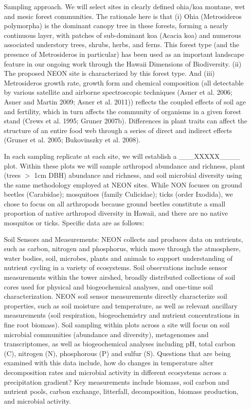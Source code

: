 \documentclass[11pt]{article}
\makeatletter
\renewcommand{\paragraph}{\@startsection{paragraph}{4}{\z@}
  {1ex \@plus 1ex \@minus .2ex}{-1em}
  {\normalfont\normalsize\it}
}
\makeatother
\begin{document}
\paragraph{Sampling approach.}
We will select sites in clearly defined ohia/koa montane, wet and mesic forest communities. The rationale here is that (i) Ohia (Metrosideros polymorpha) is the dominant canopy tree in these forests, forming a nearly continuous layer, with patches of sub-dominant koa (Acacia koa) and numerous associated understory trees, shrubs, herbs, and ferns. This forest type (and the presence of Metrosideros in particular) has been used as an important landscape feature in our ongoing work through the Hawaii Dimensions of Biodiversity. (ii) The proposed NEON site is characterized by this forest type. And (iii) Metrosideros growth rate, growth form and chemical composition (all detectable by various satellite and airborne spectroscopic techniques (Asner et al. 2006; Asner and Martin 2009; Asner et al. 2011)) reflects the coupled effects of soil age and fertility, which in turn affects the community of organisms in a given forest stand (Crews et al. 1995; Gruner 2007b). Differences in plant traits can affect the structure of an entire food web through a series of direct and indirect effects (Gruner et al. 2005; Bukovinszky et al. 2008).

In each sampling replicate at each site, we will establish a ___XXXXX____ plot. Within these plots we will sample arthropod abundance and richness, plant (trees $>$ 1cm DBH) abundance and richness, and soil microbial diversity using the same methodology employed at NEON sites.  While NON focuses on ground beetles (Carabidae); mosquitoes (family Culicidae); ticks (order Ixodida), we chose to focus on all arthropods because ground beetles constitute a small proportion of native arthropod diversity in Hawaii, and there are no native mosquitos or ticks.  Specific data are as follows:

Soil Sensors and Measurements: NEON collects and produces data on nutrients, such as carbon, nitrogen and phosphorus, which move through the atmosphere, water bodies, soil, microbes, plants and animals to support understanding of nutrient cycling in a variety of ecosystems. Soil observations include sensor measurements within the tower airshed, broadly distributed collections of soil cores used for physical and biogeochemical analyses, and one-time soil characterization. NEON soil sensor measurements directly characterize soil properties, such as soil moisture and temperature, as well as relevant ancillary measurements (soil respiration, biogeochemistry and nutrient concentrations in fine root biomass). Soil sampling within plots across a site will focus on soil microbial communities (abundance and diversity), metagenomes and transcriptomes, as well as biogeochemical analyses including pH, total carbon (C), nitrogen (N), phosphorous (P) and sulfur (S). Questions that are being examined with this data include, how do changes in temperature alter decomposition rates and microbial activity in different ecosystems across a precipitation gradient? Key measurements include biomass, soil carbon and nutrient pools, carbon exchange, litterfall, decomposition, biomass production, and microbial activity.
\end{document}
